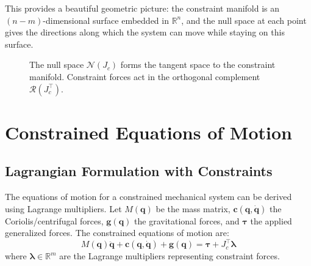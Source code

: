 \documentclass[11pt,a4paper]{article}
\theoremstyle{definition}
\newcommand{\R}{\mathbb{R}}
\newcommand{\nullspace}{\mathcal{N}}
\newcommand{\rangespace}{\mathcal{R}}
\newcommand{\Jc}{J_c}
\newcommand{\qvec}{\bm{q}}
\newcommand{\gvec}{\bm{g}}
\newcommand{\cvec}{\bm{c}}
\newcommand{\lambdavec}{\bm{\lambda}}
\newcommand{\tauvec}{\bm{\tau}}
\begin{document}
This provides a beautiful geometric picture: the constraint manifold is an $(n-m)$-dimensional surface embedded in $\R^n$, and the null space at each point gives the directions along which the system can move while staying on this surface.

\begin{figure}[htbp]
\centering
{}
\caption{The null space $\nullspace(\Jc)$ forms the tangent space to the constraint manifold. Constraint forces act in the orthogonal complement $\rangespace(\Jc^\top)$.}
\label{fig:manifold}
\end{figure}

\section{Constrained Equations of Motion}

\subsection{Lagrangian Formulation with Constraints}

The equations of motion for a constrained mechanical system can be derived using Lagrange multipliers. Let $M(\qvec)$ be the mass matrix, $\cvec(\qvec, \dot{\qvec})$ the Coriolis/centrifugal forces, $\gvec(\qvec)$ the gravitational forces, and $\tauvec$ the applied generalized forces. The constrained equations of motion are:
\begin{equation}
    \boxed{M(\qvec)\ddot{\qvec} + \cvec(\qvec, \dot{\qvec}) + \gvec(\qvec) = \tauvec + \Jc^\top \lambdavec}
\end{equation}
where $\lambdavec \in \R^m$ are the Lagrange multipliers representing constraint forces.
\end{document}

